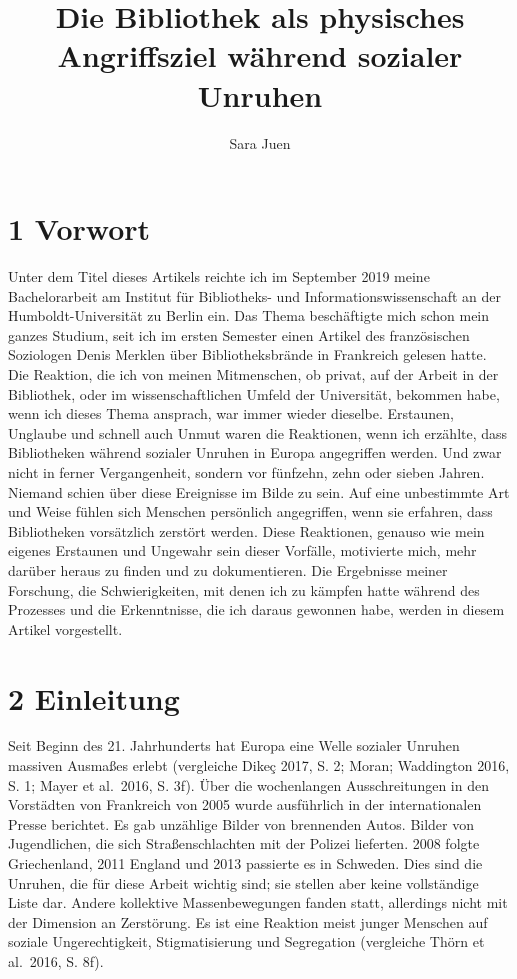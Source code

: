 \documentclass[a4paper,
fontsize=11pt,
oneside,
numbers=noperiodatend,
parskip=half-,
bibliography=totoc,
final
]{scrartcl}
\title{\LARGE{Die Bibliothek als physisches Angriffsziel während sozialer Unruhen}}%
\author{Sara Juen} %
\date{}
\begin{document}
\maketitle
\thispagestyle{fancyplain} 


\hypertarget{vorwort}{%
\section{1 Vorwort}\label{vorwort}}

Unter dem Titel dieses Artikels reichte ich im September 2019 meine
Bachelorarbeit am Institut für Bibliotheks- und Informationswissenschaft
an der Humboldt-Universität zu Berlin ein. Das Thema beschäftigte mich
schon mein ganzes Studium, seit ich im ersten Semester einen Artikel des
französischen Soziologen Denis Merklen über Bibliotheksbrände in
Frankreich gelesen hatte. Die Reaktion, die ich von meinen Mitmenschen,
ob privat, auf der Arbeit in der Bibliothek, oder im wissenschaftlichen
Umfeld der Universität, bekommen habe, wenn ich dieses Thema ansprach,
war immer wieder dieselbe. Erstaunen, Unglaube und schnell auch Unmut
waren die Reaktionen, wenn ich erzählte, dass Bibliotheken während
sozialer Unruhen in Europa angegriffen werden. Und zwar nicht in ferner
Vergangenheit, sondern vor fünfzehn, zehn oder sieben Jahren. Niemand
schien über diese Ereignisse im Bilde zu sein. Auf eine unbestimmte Art
und Weise fühlen sich Menschen persönlich angegriffen, wenn sie
erfahren, dass Bibliotheken vorsätzlich zerstört werden. Diese
Reaktionen, genauso wie mein eigenes Erstaunen und Ungewahr sein dieser
Vorfälle, motivierte mich, mehr darüber heraus zu finden und zu
dokumentieren. Die Ergebnisse meiner Forschung, die Schwierigkeiten, mit
denen ich zu kämpfen hatte während des Prozesses und die Erkenntnisse,
die ich daraus gewonnen habe, werden in diesem Artikel vorgestellt.

\hypertarget{einleitung}{%
\section{2 Einleitung}\label{einleitung}}

Seit Beginn des 21. Jahrhunderts hat Europa eine Welle sozialer Unruhen
massiven Ausmaßes erlebt (vergleiche Dikeç 2017, S. 2; Moran; Waddington
2016, S. 1; Mayer et al.~2016, S. 3f). Über die wochenlangen
Ausschreitungen in den Vorstädten von Frankreich von 2005 wurde
ausführlich in der internationalen Presse berichtet. Es gab unzählige
Bilder von brennenden Autos. Bilder von Jugendlichen, die sich
Straßenschlachten mit der Polizei lieferten. 2008 folgte Griechenland,
2011 England und 2013 passierte es in Schweden. Dies sind die Unruhen,
die für diese Arbeit wichtig sind; sie stellen aber keine vollständige
Liste dar. Andere kollektive Massenbewegungen fanden statt, allerdings
nicht mit der Dimension an Zerstörung. Es ist eine Reaktion meist junger
Menschen auf soziale Ungerechtigkeit, Stigmatisierung und Segregation
(vergleiche Thörn et al.~2016, S. 8f).
\end{document}
